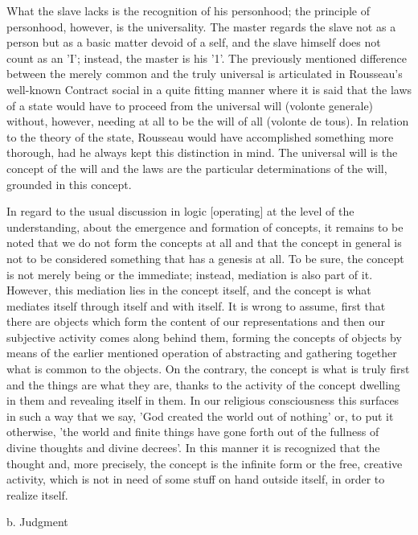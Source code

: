 What the slave lacks is the recognition of his personhood;
the principle of personhood, however, is the universality.
The master regards the slave not as a person but as a basic matter
devoid of a self, and the slave himself does not count as an 'I'; instead,
the master is his '1'.
The previously mentioned difference between the merely
common and the truly universal is articulated in Rousseau's well-known Contract
social in a quite fitting manner where it is said that the laws of a state would have
to proceed from the universal will (volonte generale) without, however, needing
at all to be the will of all (volonte de tous).
In relation to the theory of the state,
Rousseau would have accomplished something more thorough, had he always
kept this distinction in mind.
The universal will is the concept of the will and the
laws are the particular determinations of the will, grounded in this
concept.

In regard to the usual discussion in logic [operating] at
the level of the understanding, about the emergence and formation of concepts,
it remains to be noted that we do not form the concepts at all and
that the concept in general is not to be considered something that has a genesis at all.
To be sure, the concept is not merely being or the immediate;
instead, mediation is also part of it.
However, this mediation lies in the concept itself,
and the concept is what mediates itself through itself and with itself.
It is wrong to assume, first that there are objects
which form the content of our representations and
then our subjective activity comes along behind them,
forming the concepts of objects by means of the earlier mentioned operation of
abstracting and gathering together what is common to the objects.
On the contrary, the concept is what is truly first and
the things are what they are, thanks to the activity of
the concept dwelling in them and revealing itself in them.
In our religious consciousness this surfaces in such a way that we say,
'God created the world out of nothing' or, to put it otherwise,
'the world and finite things have gone forth out of
the fullness of divine thoughts and divine decrees'.
In this manner it is recognized that the thought and, more precisely,
the concept is the infinite form or the free, creative activity,
which is not in need of some stuff on hand outside itself,
in order to realize itself.

b. Judgment

